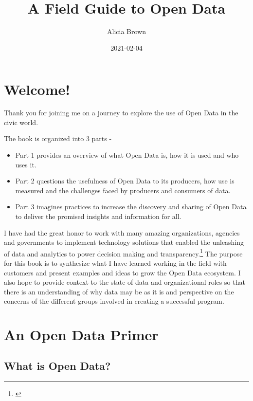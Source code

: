 \documentclass[
  openany]{book}
\title{A Field Guide to Open Data}
\author{Alicia Brown}
\date{2021-02-04}
\providecommand{\tightlist}{%
  \setlength{\itemsep}{0pt}\setlength{\parskip}{0pt}}
\begin{document}
\maketitle

{
\setcounter{tocdepth}{1}
\tableofcontents
}
\hypertarget{welcome}{%
\chapter{Welcome!}\label{welcome}}

Thank you for joining me on a journey to explore the use of Open Data in the civic world.

The book is organized into 3 parts -

\begin{itemize}
\tightlist
\item
  Part 1 provides an overview of what Open Data is, how it is used and who uses it.
\item
  Part 2 questions the usefulness of Open Data to its producers, how use is measured and the challenges faced by producers and consumers of data.
\item
  Part 3 imagines practices to increase the discovery and sharing of Open Data to deliver the promised insights and information for all.
\end{itemize}

I have had the great honor to work with many amazing organizations, agencies and governments to implement technology solutions that enabled the unleashing of data and analytics to power decision making and transparency.\footnote{\citet{blog5years}} The purpose for this book is to synthesize what I have learned working in the field with customers and present examples and ideas to grow the Open Data ecosystem. I also hope to provide context to the state of data and organizational roles so that there is an understanding of why data may be as it is and perspective on the concerns of the different groups involved in creating a successful program.

\hypertarget{overview}{%
\chapter{An Open Data Primer}\label{overview}}

\hypertarget{what-is-open-data}{%
\section{What is Open Data?}\label{what-is-open-data}}
\end{document}
